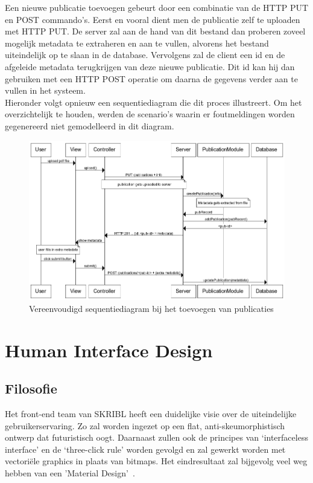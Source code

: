 \documentclass{article}
\begin{document}
Een nieuwe publicatie toevoegen gebeurt door een combinatie van de HTTP PUT en POST commando's. Eerst en vooral dient men de publicatie zelf te uploaden met HTTP PUT. De server zal aan de hand van dit bestand dan proberen zoveel mogelijk metadata te extraheren en aan te vullen, alvorens het bestand uiteindelijk op te slaan in de database. Vervolgens zal de client een id en de afgeleide metadata terugkrijgen van deze nieuwe publicatie. Dit id kan hij dan gebruiken met een HTTP POST operatie om daarna de gegevens verder aan te vullen in het systeem. \\

Hieronder volgt opnieuw een sequentiediagram die dit proces illustreert. Om het overzichtelijk te houden, werden de scenario's waarin er foutmeldingen worden gegenereerd niet gemodelleerd in dit diagram.

\begin{figure}[!h]
\centering
 \includegraphics[width=145mm]{upload-sequence.png}
 \caption{Vereenvoudigd sequentiediagram bij het toevoegen van publicaties}
 \label{upload-sequence}
\end{figure}

\clearpage

\section{Human Interface Design}

\subsection{Filosofie}

Het front-end team van SKRIBL heeft een duidelijke visie over de uiteindelijke gebruikerservaring. Zo zal worden ingezet op een flat, anti-skeumorphistisch ontwerp dat futuristisch oogt. Daarnaast zullen ook de principes van `interfaceless interface' en de `three-click rule' worden gevolgd en zal gewerkt worden met vectori\"ele graphics in plaats van bitmaps. Het eindresultaat zal bijgevolg veel weg hebben van een 'Material Design'~\cite{website:material}.
\end{document}
